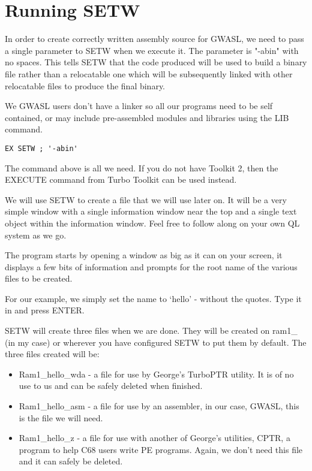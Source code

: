 \section{Running SETW}

In order to create correctly written assembly source for GWASL, we need to
        pass a single parameter to SETW when we execute it. The parameter is "-{}abin" with
        no spaces. This tells SETW that the code produced will be used to build a binary
        file rather than a relocatable one which will be subsequently linked with other
        relocatable files to produce the final binary.

We GWASL users don't have a linker so all our programs need to be self
        contained, or may include pre-{}assembled modules and libraries using the LIB
        command.

\begin{lstlisting}[firstnumber=1,caption={Executing SETW},language={}]
EX SETW ; '-abin'
\end{lstlisting}

The command above is all we need. If you do not have Toolkit 2, then the
        EXECUTE command from Turbo Toolkit can be used instead.

We will use SETW to create a file that we will use later on. It will be a
        very simple window with a single information window near the top and a single text
        object within the information window. Feel free to follow along on your own QL
        system as we go.

The program starts by opening a window as big as it can on your screen, it
        displays a few bits of information and prompts for the root name of the various
        files to be created.

For our example, we simply set the name to `hello' -{} without the quotes.
        Type it in and press ENTER.

SETW will create three files when we are done. They will be created on ram1\_
        (in my case) or wherever you have configured SETW to put them by default. The
        three files created will be:
\begin{itemize}[itemsep=0pt]

\item{}Ram1\_hello\_wda -{} a file for use by George's TurboPTR utility. It is
                of no use to us and can be safely deleted when finished.


\item{}Ram1\_hello\_asm -{} a file for use by an assembler, in our case, GWASL,
                this is the file we will need.


\item{}Ram1\_hello\_z -{} a file for use with another of George's utilities,
                CPTR, a program to help C68 users write PE programs. Again, we don't need
                this file and it can safely be deleted.

\end{itemize}

